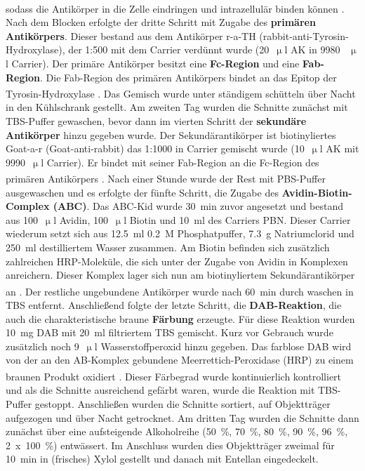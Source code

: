\documentclass[12pt,a4paper,pdftex]{article}
\begin{document}
sodass die Antikörper in die Zelle eindringen und intrazellulär binden können \textsuperscript{\cite{burry2009immunocytochemistry}}. Nach dem Blocken erfolgte der dritte Schritt mit Zugabe des \textbf{primären Antikörpers}. Dieser bestand aus dem Antikörper r-a-TH (rabbit-anti-Tyrosin-Hydroxylase), der 1:500 mit dem Carrier verdünnt wurde (20~$\upmu$l AK in 9980 ~$\upmu$l Carrier). Der primäre Antikörper besitzt eine \textbf{Fc-Region} und eine \textbf{Fab-Region}. Die Fab-Region des primären Antikörpers bindet an das Epitop der Tyrosin-Hydroxylase \textsuperscript{\cite{burry2009immunocytochemistry}}. Das Gemisch wurde unter ständigem schütteln über Nacht in den Kühlschrank gestellt. Am zweiten Tag wurden die Schnitte zunächst mit TBS-Puffer gewaschen, bevor dann im vierten Schritt der \textbf{sekundäre Antikörper} hinzu gegeben wurde. Der Sekundärantikörper ist biotinyliertes Goat-a-r (Goat-anti-rabbit) das 1:1000 in Carrier gemischt wurde (10~$\upmu$l AK mit 9990~$\upmu$l Carrier). Er bindet mit seiner Fab-Region an die Fc-Region des primären Antikörpers \textsuperscript{\cite{burry2009immunocytochemistry}}. Nach einer Stunde wurde der Rest mit PBS-Puffer ausgewaschen und es erfolgte der fünfte Schritt, die Zugabe des \textbf{Avidin-Biotin-Complex (ABC)}. Das ABC-Kid wurde 30~min zuvor angesetzt und bestand aus  100~$\upmu$l Avidin, 100~$\upmu$l Biotin und 10~ml des Carriers PBN. Dieser Carrier wiederum setzt sich aus 12.5~ml 0.2~M Phosphatpuffer, 7.3~g Natriumclorid und 250~ml destilliertem Wasser zusammen. Am Biotin befinden sich zusätzlich zahlreichen HRP-Moleküle, die sich unter der Zugabe von Avidin in Komplexen anreichern. Dieser Komplex lager sich nun am biotinyliertem Sekundärantikörper an \textsuperscript{\cite{burry2009immunocytochemistry}}. Der restliche ungebundene Antikörper wurde nach 60~min durch waschen in TBS entfernt. Anschließend folgte der letzte Schritt, die \textbf{DAB-Reaktion}, die auch die charakteristische braune \textbf{Färbung} erzeugte. Für diese Reaktion wurden 10~mg DAB mit 20~ml filtriertem TBS gemischt. Kurz vor Gebrauch wurde zusätzlich noch 9~$\upmu$l Wasserstoffperoxid hinzu gegeben. Das farblose DAB wird von der an den AB-Komplex gebundene Meerrettich-Peroxidase (HRP) zu einem braunen Produkt oxidiert \textsuperscript{\cite{burry2009immunocytochemistry}}. Dieser Färbegrad wurde kontinuierlich kontrolliert und als die Schnitte ausreichend gefärbt waren, wurde die Reaktion mit TBS-Puffer gestoppt. Anschließen wurden die Schnitte sortiert, auf Objektträger aufgezogen und über Nacht getrocknet. Am dritten Tag wurden die Schnitte dann zunächst über eine aufsteigende Alkoholreihe (50~\%, 70~\%, 80~\%, 90~\%, 96~\%, 2~x~100~\%) entwässert. Im Anschluss wurden dies Objektträger zweimal für 10~min in (frisches) Xylol gestellt und danach mit Entellan eingedeckelt.  
\end{document}
